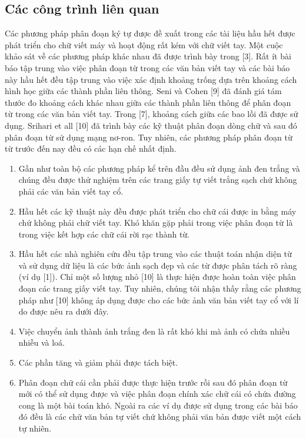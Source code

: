 \documentclass[a4paper]{article}
\begin{document}
\subsection{Các công trình liên quan}
Các phương pháp phân đoạn ký tự được đề xuất trong các tài liệu hầu hết được phát triển cho chữ viết máy và hoạt động rất kém với chữ viết tay. Một cuộc khảo sát về các phương pháp khác nhau đã được trình bày trong [3]. Rất ít bài báo tập trung vào việc phân đoạn từ trong các văn bản viết tay và các bài báo này hầu hết đều tập trung vào việc xác định khoảng trống dựa trên khoảng cách hình học giữa các thành phần liên thông. Seni và Cohen [9] đã đánh giá tám thước đo khoảng cách khác nhau giữa các thành phần liên thông để phân đoạn từ trong các văn bản viết tay. Trong [7], khoảng cách giữa các bao lồi đã được sử dụng. Srihari et all [10] đã trình bày các kỹ thuật phân đoạn dòng chữ và sau đó phân đoạn từ sử dụng mạng nơ-ron. Tuy nhiên, các phương pháp phân đoạn từ từ trước đến nay đều có các hạn chế nhất định.
\begin{enumerate}
    \item Gần như toàn bộ các phương pháp kể trên đầu đều sử dụng ảnh đen trắng và chúng đều được thử nghiệm trên các trang giấy tự viết trắng sạch chứ không phải các văn bản viết tay cổ.
    \item Hầu hết các kỹ thuật này đều được phát triển cho chữ cái được in bằng máy chứ không phải chữ viết tay. Khó khăn gặp phải trong việc phân đoạn từ là trong việc kết hợp các chữ cái rời rạc thành từ.
    \item Hầu hết các nhà nghiên cứu đều tập trung vào các thuật toán nhận diện từ và sử dụng dữ liệu là các bức ảnh sạch đẹp và các từ được phân tách rõ ràng (ví dụ [1]). Chỉ một số lượng nhỏ [10] là thực hiện được hoàn toàn việc phân đoạn các trang giấy viết tay. Tuy nhiên, chúng tôi nhận thấy rằng các phương pháp như [10] không áp dụng được cho các bức ảnh văn bản viết tay cổ với lí do được nêu ra dưới đây.
    \item Việc chuyển ảnh thành ảnh trắng đen là rất khó khi mà ảnh có chứa nhiều nhiễu và loá.
    \item Các phần tăng và giảm phải được tách biệt.
    \item Phân đoạn chữ cái cần phải được thực hiện trước rồi sau đó phân đoạn từ mới có thể sử dụng được và việc phân đoạn chính xác chữ cái có chứa đường cong là một bài toán khó. Ngoài ra các ví dụ được sử dụng trong các bài báo đó đều là các chữ văn bản tự viết chứ không phải văn bản được viết một cách tự nhiên.
\end{enumerate}
\end{document}
